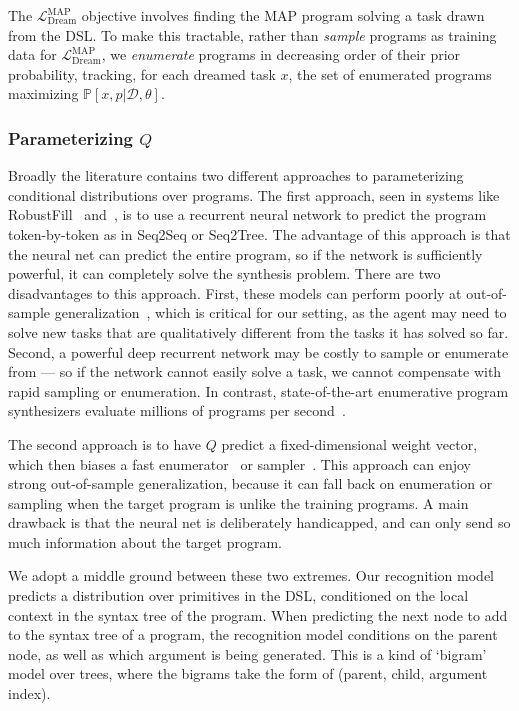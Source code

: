 \documentclass{article}
\newcommand{\probability}{\mathds{P}} %
\begin{document}
The $\mathcal{L}_{\text{Dream}}^{\text{MAP}}$ objective involves
finding the MAP program solving a task drawn from the DSL.
To make this tractable,
rather than \emph{sample} programs as training data for $\mathcal{L}_{\text{Dream}}^{\text{MAP}}$,
we \emph{enumerate} programs
in decreasing order of their prior probability,
tracking,
for each dreamed task $x$,
the set of enumerated programs maximizing
$\probability[x,p|\mathcal{D},\theta]$.


\subsubsection{Parameterizing $Q$}\label{recognitionParameterization}

Broadly the literature contains two different approaches to
parameterizing conditional distributions over programs.  The first
approach, seen in systems like RobustFill~\cite{devlin2017robustfill}
and~\cite{zavershynskyi2018naps}, is to use a recurrent neural network
to predict the program token-by-token as in Seq2Seq or Seq2Tree.  The
advantage of this approach is that the neural net can predict the
entire program, so if the network is sufficiently powerful, it can
completely solve the synthesis problem.  There are two disadvantages
to this approach.  First, these models can perform poorly at out-of-sample
generalization~\cite{}, which is critical for our setting, as the
agent may need to solve new tasks that are qualitatively different
from the tasks it has solved so far.  Second, a powerful deep
recurrent network may be costly to sample or enumerate from ---
so if the network cannot easily solve a task, we cannot compensate
with rapid sampling or enumeration.  In contrast, state-of-the-art
enumerative program synthesizers evaluate millions of programs per
second~\cite{feser2015synthesizing}.

The second approach is to have $Q$ predict a fixed-dimensional weight
vector, which then biases a fast enumerator~\cite{balog2016deepcoder}
or sampler~\cite{menon2013machine}.  This approach can enjoy strong
out-of-sample generalization, because it can fall back on enumeration
or sampling when the target program is unlike the training programs.
A main drawback is that the neural net is deliberately handicapped,
and can only send so much information about the target program.

We adopt a middle ground between these two extremes.  Our recognition
model predicts a distribution over primitives in the DSL,
conditioned on the local context in the syntax tree of the
program. When predicting the next node to add to the syntax tree of a program,
the recognition model
conditions on the parent node, as well as
which argument is being generated.
This is a kind of `bigram' model over trees,
where the bigrams
take the form of (parent, child, argument index).
\end{document}
